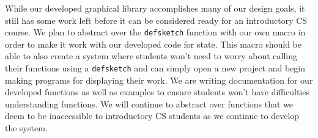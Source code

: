 \documentclass[12pt]{article}
\newcommand{\comment}[1]{}
\newcommand{\emcomment}[1]{\textcolor{ForestGreen}{\comment{Elena: {#1}}}}
\begin{document}
While our developed graphical library accomplishes many of our design goals, it still has some work left before it can be considered ready for an introductory CS course. We plan to abstract over the \texttt{defsketch} function with our own macro in order to make it work with our developed code for state. This macro should be able to also create a system where students won't need to worry about calling their functions using a \texttt{defsketch} and can simply open a new project and begin making programs for displaying their work. We are writing documentation for our developed functions as well as examples to ensure students won't have difficulties understanding functions. We will continue to abstract over functions that we deem to be inaccessible to introductory CS students as we continue to develop the system. %


%
%

%  
%
%




\end{document}
